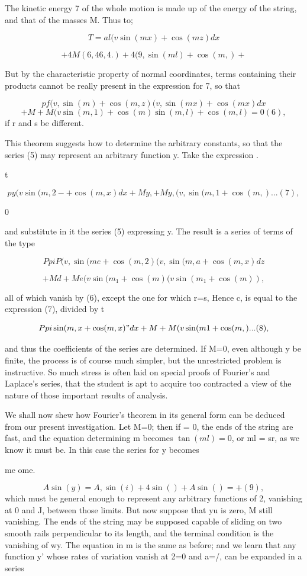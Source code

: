 The kinetic energy 7 of the whole motion is made up of the energy of the
string, and that of the masses M. Thus to;

\[T= al   (v \sin(mx) + \cos(mz)  dx\]

\[+4M (6, 46,4.) +4 (9, \sin(ml) + \cos(m,) +\]

But by the characteristic property of normal coordinates, terms containing
their products cannot be really present in the expression for 7, so that

\[p f (v, \sin(m) + \cos(m,z) (v, \sin(mx) + \cos(mx) dx\]
\[+M+M (v \sin(m,1)+ \cos(m) \sin(m,l) + \cos(m,l) = 0 (6),\]
if r and s be different.

This theorem suggests how to determine the arbitrary constants, so that the
series (5) may represent an arbitrary function y. Take the expression .

t

\[p   y (v \sin(m,2-+ \cos(m,x)dx+My,+ My,(v, \sin(m,1 + \cos(m, )...(7),\]

0

and substitute in it the series (5) expressing y. The result is a series of
terms of the type

\[Pp   iP (v, \sin(me + \cos(m,2) (v, \sin(m,a + \cos(m,x) dz\]

\[+ Md + Me (v \sin(m_1 + \cos(m ) (v \sin(m_1 + \cos(m)),\]

all of which vanish by (6), except the one for which r=s, Hence c, is equal to
the expression (7), divided by t

\[Pp i  \sin(m,x + \cos(m,x)" dx + M+ M (v \sin(m1 + \cos(m, ) ...(8),\]

and thus the coefficients of the series are determined. If M=0, even although y
be finite, the process is of course much simpler, but the unrestricted problem
is instructive. So much stress is often laid on special proofs of Fourier's and
Laplace's series, that the student is apt to acquire too contracted a view of
the nature of those important results of analysis.


We shall now shew how Fourier's theorem in its general form can be deduced from
our present investigation. Let M=0; then if = 0, the ends of the string are
fast, and the equation determining m becomes \( \tan(ml) =0\), or ml = sr, as
we know it must be. In this case the series for y becomes

me ome.

\[A \sin(y)= A, \sin(i) +4 \sin()+ A \sin()= + (9),\]
which must be general
enough to represent any arbitrary functions of 2, vanishing at 0 and J, between
those limits. But now suppose that yu is zero, M still vanishing. The ends of
the string may be supposed capable of sliding on two smooth rails perpendicular
to its length, and the terminal condition is the vanishing of wy. The equation
in m is the same as before; and we learn that any function y' whose rates of
variation vanish at 2=0 and a=/, can be expanded in a series

